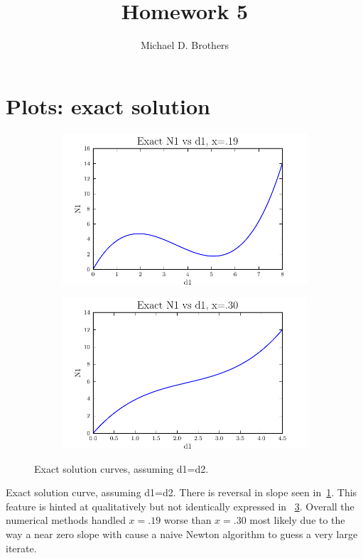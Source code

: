 \documentclass[10pt,letterpaper]{article}
\author{Michael D. Brothers}
\title{Homework 5}
\begin{document}
\section{Plots: exact solution}

\begin{figure}[!tbh]
  \begin{subfigure}[b]{.6\textwidth}
    \includegraphics[width=\textwidth]{exact_x19.pdf}
    \caption{}
    \label{fig1:label:a}
  \end{subfigure}
  \hfill
  \begin{subfigure}[b]{.6\textwidth}
    \includegraphics[width=\textwidth]{exact_x30.pdf}
    \caption{}
    \label{fig1:label:b}
  \end{subfigure}
  \caption{Exact solution curves, assuming d1=d2.}
\end{figure}

Exact solution curve, assuming d1=d2. There is reversal in slope seen in~\ref{fig1:label:a}. This feature is hinted at qualitatively but not identically expressed in ~\ref{fig1:label:b}. Overall the numerical methods handled $x=.19$ worse than $x=.30$ most likely due to the way a near zero slope with cause a naive Newton algorithm to guess a very large iterate.
\end{document}
